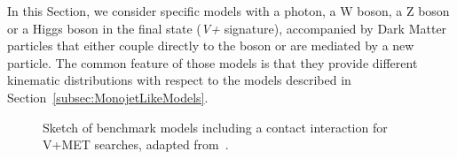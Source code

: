
In this Section, we consider specific models with a photon, a W boson, a Z boson or a Higgs boson in the final state (\textit{V+\MET} signature), accompanied by Dark Matter particles that either couple directly to the boson or are mediated by a new particle. The common feature of those models is that they provide different kinematic distributions with respect to the models described in Section~\ref{subsec:MonojetLikeModels}.



\begin{figure}[h!]
	\centering
	\vspace{\baselineskip}
	\textwidth
	\begin{feynmandiagram}[modelVeft5pt]
	\end{feynmandiagram}
	
	\vspace{\baselineskip}
	\caption{Sketch of benchmark models including a contact interaction
		for V+MET searches, adapted from~\cite{Nelson:2013pqa}. \label{fig:VPlusMET_EFT}}
\end{figure}

